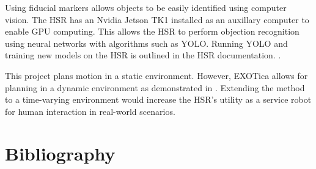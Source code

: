 \documentclass[12pt]{article}
\begin{document}
        \par Using fiducial markers allows objects to be easily identified using computer vision. The HSR has an Nvidia Jetson TK1 installed as an auxillary computer to enable GPU computing. This allows the HSR to perform objection recognition using neural networks with algorithms such as YOLO. Running YOLO and training new models on the HSR is outlined in the HSR documentation. \cite{noauthor_hsrb_manual_nodate}.

        \par This project plans motion in a static environment. However, EXOTica allows for planning in a dynamic environment as demonstrated in \cite{yang_planning_2018}. Extending the method to a time-varying environment would increase the HSR's utility as a service robot for human interaction in real-world scenarios.

    \newpage

\section{Bibliography}
    
    
\end{document}
